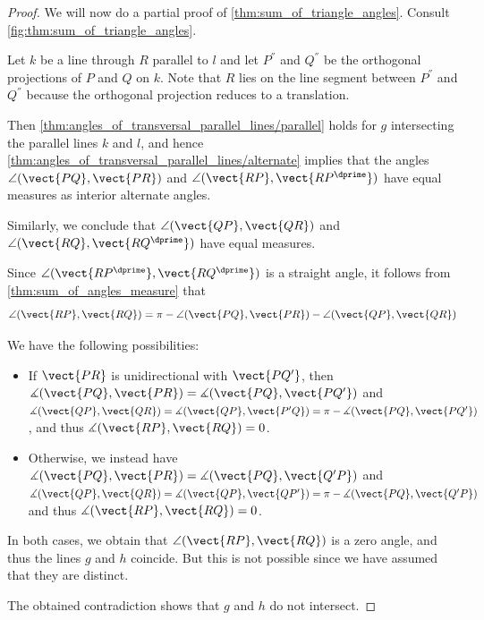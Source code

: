 \begin{proof}
  We will now do a partial proof of \cref{thm:sum_of_triangle_angles}. Consult \cref{fig:thm:sum_of_triangle_angles}.

  Let \( k \) be a line through \( R \) parallel to \( l \) and let \( P^\dprime \) and \( Q^\dprime \) be the orthogonal projections of \( P \) and \( Q \) on \( k \). Note that \( R \) lies on the line segment between \( P^\dprime \) and \( Q^\dprime \) because the orthogonal projection reduces to a translation.

  Then \cref{thm:angles_of_transversal_parallel_lines/parallel} holds for \( g \) intersecting the parallel lines \( k \) and \( l \), and hence \cref{thm:angles_of_transversal_parallel_lines/alternate} implies that the angles \( \angle(\vect{PQ}, \vect{PR}) \) and \( \angle(\vect{RP}, \vect{RP^\dprime}) \) have equal measures as interior alternate angles.

  Similarly, we conclude that \( \angle(\vect{QP}, \vect{QR}) \) and \( \angle(\vect{RQ}, \vect{RQ^\dprime}) \) have equal measures.

  Since \( \angle(\vect{RP^\dprime}, \vect{RQ^\dprime}) \) is a straight angle, it follows from \cref{thm:sum_of_angles_measure} that
  \begin{equation*}
    \angle(\vect{RP}, \vect{RQ}) = \pi - \angle(\vect{PQ}, \vect{PR}) - \angle(\vect{QP}, \vect{QR})
  \end{equation*}

  We have the following possibilities:
  \begin{itemize}
    \item If \( \vect{PR} \) is unidirectional with \( \vect{PQ'} \), then \( \measuredangle(\vect{PQ}, \vect{PR}) = \measuredangle(\vect{PQ}, \vect{PQ'}) \) and \( \measuredangle(\vect{QP}, \vect{QR}) = \measuredangle(\vect{QP}, \vect{P'Q}) = \pi - \measuredangle(\vect{PQ}, \vect{PQ'}) \), and thus \( \measuredangle(\vect{RP}, \vect{RQ}) = 0 \).

    \item Otherwise, we instead have \( \measuredangle(\vect{PQ}, \vect{PR}) = \measuredangle(\vect{PQ}, \vect{Q'P}) \) and \( \measuredangle(\vect{QP}, \vect{QR}) = \measuredangle(\vect{QP}, \vect{QP'}) = \pi - \measuredangle(\vect{PQ}, \vect{Q'P}) \) and thus \( \measuredangle(\vect{RP}, \vect{RQ}) = 0 \).
  \end{itemize}

  In both cases, we obtain that \( \angle(\vect{RP}, \vect{RQ}) \) is a zero angle, and thus the lines \( g \) and \( h \) coincide. But this is not possible since we have assumed that they are distinct.

  The obtained contradiction shows that \( g \) and \( h \) do not intersect.
\end{proof}
